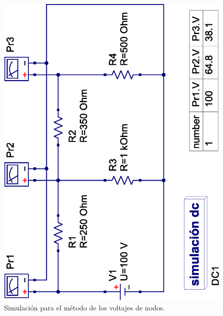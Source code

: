 \documentclass[letter,11pt]{article}
\begin{document}
\begin{figure}[!h]
\centering
\includegraphics[scale=0.75]{simulation/practica3.1.eps}
\caption{Simulación para el método de los voltajes de nodos.}
\label{simulacion1}
\end{figure}

\newpage
\end{document}
